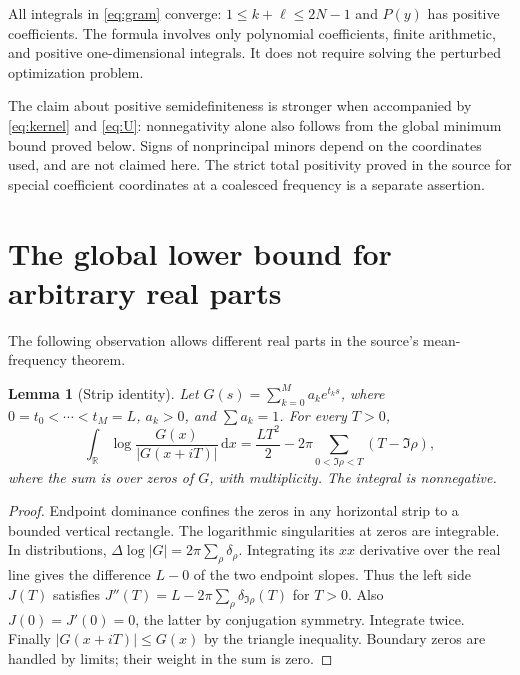 \documentclass[11pt]{article}
\newtheorem{lemma}[theorem]{Lemma}
\theoremstyle{remark}\newtheorem{remark}[theorem]{Remark}
\newcommand{\R}{\mathbb R}\newcommand{\C}{\mathbb C}
\newcommand{\dd}{\,\mathrm d}
\newcommand{\abs}[1]{\lvert#1\rvert}
\begin{document}
All integrals in \eqref{eq:gram} converge: $1\le k+\ell\le2N-1$ and $P(y)$ has positive coefficients. The formula involves only polynomial coefficients, finite arithmetic, and positive one-dimensional integrals. It does not require solving the perturbed optimization problem.

The claim about positive semidefiniteness is stronger when accompanied by \eqref{eq:kernel} and \eqref{eq:U}: nonnegativity alone also follows from the global minimum bound proved below. Signs of nonprincipal minors depend on the coordinates used, and are not claimed here. The strict total positivity proved in the source for special coefficient coordinates at a coalesced frequency is a separate assertion.

\section{The global lower bound for arbitrary real parts}

The following observation allows different real parts in the source's mean-frequency theorem.

\begin{lemma}[Strip identity]\label{lem:strip}
Let $G(s)=\sum_{k=0}^M a_ke^{t_ks}$, where $0=t_0<\cdots<t_M=L$, $a_k>0$, and $\sum a_k=1$. For every $T>0$,
\begin{equation}\label{eq:strip}
 \int_\R\log\frac{G(x)}{\abs{G(x+iT)}}\dd x
 =\frac{LT^2}{2}-2\pi\sum_{0<\Im\rho<T}(T-\Im\rho),
\end{equation}
where the sum is over zeros of $G$, with multiplicity. The integral is nonnegative.
\end{lemma}
\begin{proof}
Endpoint dominance confines the zeros in any horizontal strip to a bounded vertical rectangle. The logarithmic singularities at zeros are integrable. In distributions, $\Delta\log|G|=2\pi\sum_\rho\delta_\rho$. Integrating its $xx$ derivative over the real line gives the difference $L-0$ of the two endpoint slopes. Thus the left side $J(T)$ satisfies $J''(T)=L-2\pi\sum_\rho\delta_{\Im\rho}(T)$ for $T>0$. Also $J(0)=J'(0)=0$, the latter by conjugation symmetry. Integrate twice. Finally $|G(x+iT)|\le G(x)$ by the triangle inequality. Boundary zeros are handled by limits; their weight in the sum is zero.
\end{proof}
\end{document}
